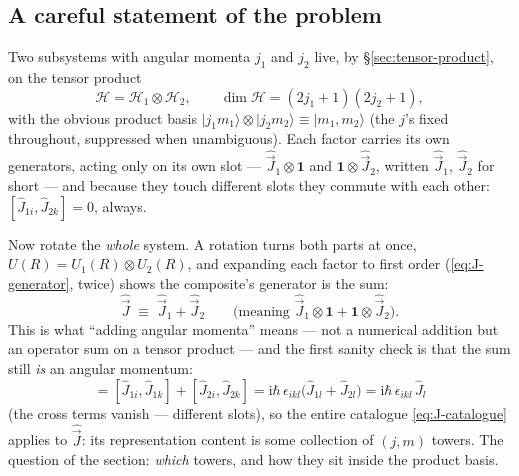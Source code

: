 \documentclass[11pt]{article}
\theoremstyle{plain}
\theoremstyle{definition}
\theoremstyle{remark}
\newcommand{\ii}{\mathrm{i}}
\newcommand{\op}[1]{\hat{#1}}
\newcommand{\idop}{\mathbf{1}}  %
\newcommand{\ket}[1]{\lvert #1 \rangle}
\begin{document}
\subsection{A careful statement of the problem}
\label{sec:addition-problem}

Two subsystems with angular momenta $j_1$ and $j_2$ live, by
\S\ref{sec:tensor-product}, on the tensor product
\begin{equation}
  \mathcal H = \mathcal H_1 \otimes \mathcal H_2,
  \qquad
  \dim \mathcal H = (2j_1 + 1)(2j_2 + 1),
\end{equation}
with the obvious product basis
$\ket{j_1 m_1}\otimes\ket{j_2 m_2} \equiv \ket{m_1, m_2}$ (the
$j$'s fixed throughout, suppressed when unambiguous). Each factor
carries its own generators, acting only on its own slot ---
$\op{\vec J}_1 \otimes \idop$ and $\idop \otimes \op{\vec J}_2$,
written $\op{\vec J}_1$, $\op{\vec J}_2$ for short --- and because
they touch different slots they commute with each other:
$[\op J_{1i}, \op J_{2k}] = 0$, always.

Now rotate the \emph{whole} system. A rotation turns both parts at
once, $U(R) = U_1(R)\otimes U_2(R)$, and expanding each factor to
first order (\eqref{eq:J-generator}, twice) shows the composite's
generator is the sum:
\begin{equation}
  \op{\vec J} \;\equiv\; \op{\vec J}_1 + \op{\vec J}_2
  \qquad\text{(meaning }
  \op{\vec J}_1\otimes\idop + \idop\otimes\op{\vec J}_2\text{)}.
\end{equation}
This is what ``adding angular momenta'' means --- not a numerical
addition but an operator sum on a tensor product --- and the first
sanity check is that the sum still \emph{is} an angular momentum:
\begin{equation}
  [\op J_i, \op J_k]
  = [\op J_{1i}, \op J_{1k}] + [\op J_{2i}, \op J_{2k}]
  = \ii\hbar\,\epsilon_{ikl}
    \bigl(\op J_{1l} + \op J_{2l}\bigr)
  = \ii\hbar\,\epsilon_{ikl}\,\op J_l
  \label{eq:sum-is-J}
\end{equation}
(the cross terms vanish --- different slots), so the entire
catalogue \eqref{eq:J-catalogue} applies to $\op{\vec J}$: its
representation content is some collection of $(j, m)$ towers. The
question of the section: \emph{which} towers, and how they sit
inside the product basis.
\end{document}
